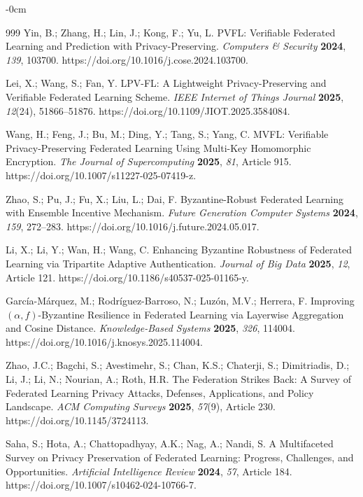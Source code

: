 \documentclass[futureinternet,article,submit,pdftex,moreauthors]{Definitions/mdpi}
\begin{document}
\begin{adjustwidth}{-\extralength}{0cm}
\begin{thebibliography}{999}
Yin, B.; Zhang, H.; Lin, J.; Kong, F.; Yu, L.
PVFL: Verifiable Federated Learning and Prediction with Privacy-Preserving.
\textit{Computers \& Security} \textbf{2024}, \textit{139}, 103700.
https://doi.org/10.1016/j.cose.2024.103700.

Lei, X.; Wang, S.; Fan, Y.
LPV-FL: A Lightweight Privacy-Preserving and Verifiable Federated Learning Scheme.
\textit{IEEE Internet of Things Journal} \textbf{2025}, \textit{12}(24), 51866--51876.
https://doi.org/10.1109/JIOT.2025.3584084.

Wang, H.; Feng, J.; Bu, M.; Ding, Y.; Tang, S.; Yang, C.
MVFL: Verifiable Privacy-Preserving Federated Learning Using Multi-Key Homomorphic Encryption.
\textit{The Journal of Supercomputing} \textbf{2025}, \textit{81}, Article 915.
https://doi.org/10.1007/s11227-025-07419-z.

Zhao, S.; Pu, J.; Fu, X.; Liu, L.; Dai, F.
Byzantine-Robust Federated Learning with Ensemble Incentive Mechanism.
\textit{Future Generation Computer Systems} \textbf{2024}, \textit{159}, 272--283.
https://doi.org/10.1016/j.future.2024.05.017.

Li, X.; Li, Y.; Wan, H.; Wang, C.
Enhancing Byzantine Robustness of Federated Learning via Tripartite Adaptive Authentication.
\textit{Journal of Big Data} \textbf{2025}, \textit{12}, Article 121.
https://doi.org/10.1186/s40537-025-01165-y.

García-Márquez, M.; Rodríguez-Barroso, N.; Luzón, M.V.; Herrera, F.
Improving \((\alpha,f)\)-Byzantine Resilience in Federated Learning via Layerwise Aggregation and Cosine Distance.
\textit{Knowledge-Based Systems} \textbf{2025}, \textit{326}, 114004.
https://doi.org/10.1016/j.knosys.2025.114004.

Zhao, J.C.; Bagchi, S.; Avestimehr, S.; Chan, K.S.; Chaterji, S.; Dimitriadis, D.; Li, J.; Li, N.; Nourian, A.; Roth, H.R.
The Federation Strikes Back: A Survey of Federated Learning Privacy Attacks, Defenses, Applications, and Policy Landscape.
\textit{ACM Computing Surveys} \textbf{2025}, \textit{57}(9), Article 230.
https://doi.org/10.1145/3724113.

Saha, S.; Hota, A.; Chattopadhyay, A.K.; Nag, A.; Nandi, S.
A Multifaceted Survey on Privacy Preservation of Federated Learning: Progress, Challenges, and Opportunities.
\textit{Artificial Intelligence Review} \textbf{2024}, \textit{57}, Article 184.
https://doi.org/10.1007/s10462-024-10766-7.


\end{thebibliography}
\end{adjustwidth}
\end{document}
